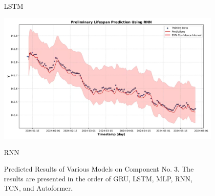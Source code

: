 \begin{figure}[H]
\begin{minipage}[t]{\linewidth}
		\caption*{LSTM}
	\end{minipage}
	\vfill
	\begin{minipage}[t]{\linewidth}
		\centering
		\includegraphics[width=\linewidth]{figures/Prediction_RNN}
		\caption*{RNN}
	\end{minipage}
	\caption{Predicted Results of Various Models on Component No. 3. The results are presented in the order of GRU, LSTM, MLP, RNN, TCN, and Autoformer.}
	\label{fig:Prediction_All_Model}
\end{figure}